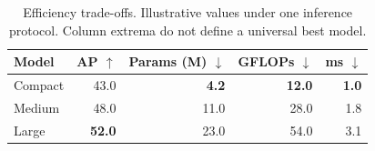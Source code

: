 \begin{table}[!htbp]
\centering\small
\setlength{\tabcolsep}{3pt}
\begin{tabular}{lrrrr}
\toprule
Model & AP $\uparrow$ & Params (M) $\downarrow$ & GFLOPs $\downarrow$ & ms $\downarrow$ \\
\midrule
Compact & 43.0 & \textbf{4.2} & \textbf{12.0} & \textbf{1.0} \\
Medium & 48.0 & 11.0 & 28.0 & 1.8 \\
Large & \textbf{52.0} & 23.0 & 54.0 & 3.1 \\
\bottomrule
\end{tabular}
\caption{Efficiency trade-offs. Illustrative values under one inference protocol. Column extrema do not define a universal best model.}
\label{tab:efficiency}
\end{table}
